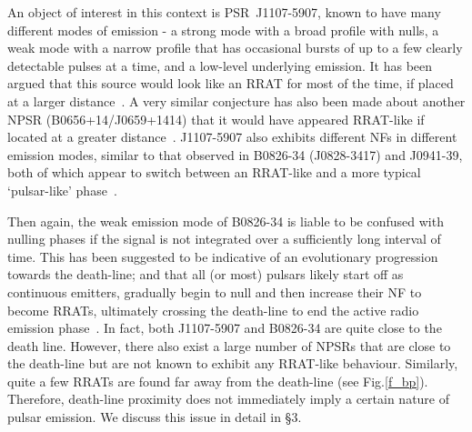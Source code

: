 \documentclass{jaa}
\begin{document}
An object of interest in this context is PSR~J1107-5907, known to have
many different modes of emission -  a strong mode with a broad profile
with nulls,  a weak  mode with  a narrow  profile that  has occasional
bursts of  up to  a few  clearly detectable  pulses at  a time,  and a
low-level underlying  emission. It  has been  argued that  this source
would look like  an RRAT for most  of the time, if placed  at a larger
distance~\cite{young14}. A very similar  conjecture has also been made
about another  NPSR (B0656+14/J0659+1414) that it  would have appeared
RRAT-like if located at a greater distance~\cite{welte06}.  J1107-5907
also exhibits  different NFs in  different emission modes,  similar to
that observed  in B0826-34  (J0828-3417) and  J0941-39, both  of which
appear to switch between an RRAT-like and a more typical ‘pulsar-like’
phase~\cite{burke10,burke12,esamd12}.

Then  again, the  weak  emission  mode of  B0826-34  is  liable to  be
confused with  nulling phases if the  signal is not integrated  over a
sufficiently long  interval of  time.  This has  been suggested  to be
indicative of an evolutionary  progression towards the death-line; and
that all  (or most) pulsars  likely start off as  continuous emitters,
gradually begin  to null and then  increase their NF to  become RRATs,
ultimately crossing  the death-line to  end the active  radio emission
phase~\cite{burke10}.  In fact, both J1107-5907 and B0826-34 are quite
close to the death line.  However,  there also exist a large number of
NPSRs that  are close to the  death-line but are not  known to exhibit
any RRAT-like behaviour.   Similarly, quite a few RRATs  are found far
away from  the death-line (see Fig.\ref{f_bp}).  Therefore, death-line
proximity  does  not immediately  imply  a  certain nature  of  pulsar
emission. We discuss this issue in detail in \S3.
\end{document}
